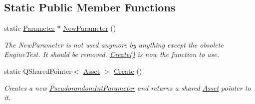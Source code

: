\subsection*{Static Public Member Functions}
\begin{DoxyCompactItemize}
\item 
\hypertarget{class_picto_1_1_pseudorandom_int_parameter_a0dfc1fd3cfbed88e6985ebafd6c03e97}{static \hyperlink{class_picto_1_1_parameter}{Parameter} $\ast$ \hyperlink{class_picto_1_1_pseudorandom_int_parameter_a0dfc1fd3cfbed88e6985ebafd6c03e97}{New\-Parameter} ()}\label{class_picto_1_1_pseudorandom_int_parameter_a0dfc1fd3cfbed88e6985ebafd6c03e97}

\begin{DoxyCompactList}\small\item\em The New\-Parameter is not used anymore by anything except the obsolete Engine\-Test. It should be removed. \hyperlink{class_picto_1_1_pseudorandom_int_parameter_a50de9256ac7fa016ef655e970e017448}{Create()} is now the function to use. \end{DoxyCompactList}\item 
\hypertarget{class_picto_1_1_pseudorandom_int_parameter_a50de9256ac7fa016ef655e970e017448}{static Q\-Shared\-Pointer$<$ \hyperlink{class_picto_1_1_asset}{Asset} $>$ \hyperlink{class_picto_1_1_pseudorandom_int_parameter_a50de9256ac7fa016ef655e970e017448}{Create} ()}\label{class_picto_1_1_pseudorandom_int_parameter_a50de9256ac7fa016ef655e970e017448}

\begin{DoxyCompactList}\small\item\em Creates a new \hyperlink{class_picto_1_1_pseudorandom_int_parameter}{Pseudorandom\-Int\-Parameter} and returns a shared \hyperlink{class_picto_1_1_asset}{Asset} pointer to it. \end{DoxyCompactList}\end{DoxyCompactItemize}
